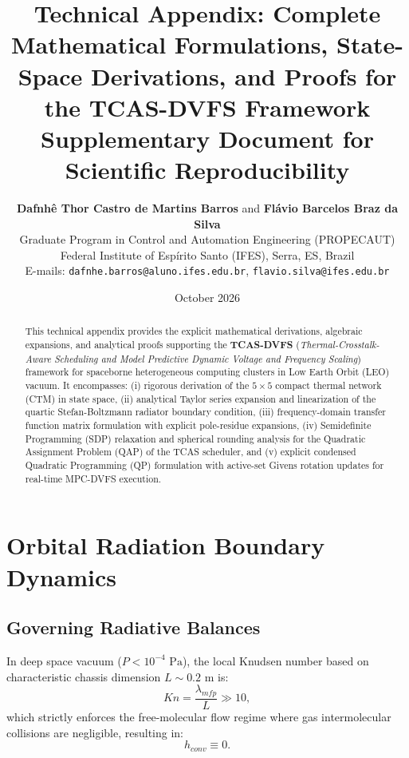 \documentclass[11pt,a4paper]{article}
\title{\textbf{Technical Appendix: Complete Mathematical Formulations, State-Space Derivations, and Proofs for the TCAS-DVFS Framework}\\[6pt]
\large Supplementary Document for Scientific Reproducibility}
\author{\textbf{Dafnh\^e Thor Castro de Martins Barros} and \textbf{Fl\'avio Barcelos Braz da Silva}\\
Graduate Program in Control and Automation Engineering (PROPECAUT)\\
Federal Institute of Esp\'irito Santo (IFES), Serra, ES, Brazil\\
E-mails: \texttt{dafnhe.barros@aluno.ifes.edu.br}, \texttt{flavio.silva@ifes.edu.br}}
\date{October 2026}
\begin{document}
\maketitle

\begin{abstract}
This technical appendix provides the explicit mathematical derivations, algebraic expansions, and analytical proofs supporting the \textbf{TCAS-DVFS} (\textit{Thermal-Crosstalk-Aware Scheduling and Model Predictive Dynamic Voltage and Frequency Scaling}) framework for spaceborne heterogeneous computing clusters in Low Earth Orbit (LEO) vacuum. It encompasses: (i) rigorous derivation of the $5\times 5$ compact thermal network (CTM) in state space, (ii) analytical Taylor series expansion and linearization of the quartic Stefan-Boltzmann radiator boundary condition, (iii) frequency-domain transfer function matrix formulation with explicit pole-residue expansions, (iv) Semidefinite Programming (SDP) relaxation and spherical rounding analysis for the Quadratic Assignment Problem (QAP) of the TCAS scheduler, and (v) explicit condensed Quadratic Programming (QP) formulation with active-set Givens rotation updates for real-time MPC-DVFS execution.
\end{abstract}

\tableofcontents
\newpage

\section{Orbital Radiation Boundary Dynamics}

\subsection{Governing Radiative Balances}
In deep space vacuum ($P < 10^{-4}\text{ Pa}$), the local Knudsen number based on characteristic chassis dimension $L \sim 0.2\text{ m}$ is:
\begin{equation}
Kn = \frac{\lambda_{mfp}}{L} \gg 10,
\end{equation}
which strictly enforces the free-molecular flow regime where gas intermolecular collisions are negligible, resulting in:
\begin{equation}
h_{conv} \equiv 0.
\end{equation}
\end{document}
